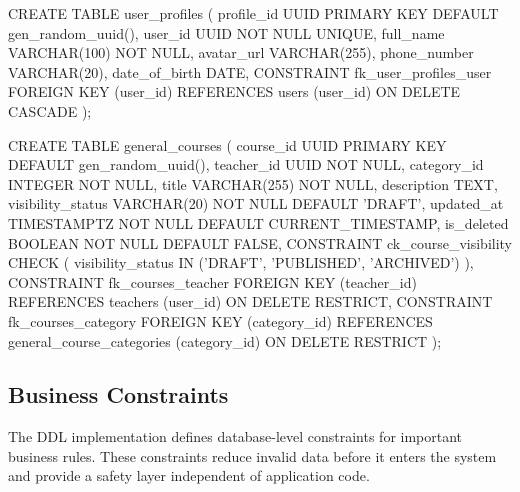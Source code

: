 \begin{sqlcode}[caption={Representative foreign key relationships},label={lst:ddl-foreign-key-examples}]
CREATE TABLE user_profiles (
    profile_id UUID PRIMARY KEY DEFAULT gen_random_uuid(),
    user_id UUID NOT NULL UNIQUE,
    full_name VARCHAR(100) NOT NULL,
    avatar_url VARCHAR(255),
    phone_number VARCHAR(20),
    date_of_birth DATE,
    CONSTRAINT fk_user_profiles_user
        FOREIGN KEY (user_id)
        REFERENCES users (user_id)
        ON DELETE CASCADE
);

CREATE TABLE general_courses (
    course_id UUID PRIMARY KEY DEFAULT gen_random_uuid(),
    teacher_id UUID NOT NULL,
    category_id INTEGER NOT NULL,
    title VARCHAR(255) NOT NULL,
    description TEXT,
    visibility_status VARCHAR(20) NOT NULL DEFAULT 'DRAFT',
    updated_at TIMESTAMPTZ NOT NULL DEFAULT CURRENT_TIMESTAMP,
    is_deleted BOOLEAN NOT NULL DEFAULT FALSE,
    CONSTRAINT ck_course_visibility CHECK (
        visibility_status IN ('DRAFT', 'PUBLISHED', 'ARCHIVED')
    ),
    CONSTRAINT fk_courses_teacher
        FOREIGN KEY (teacher_id)
        REFERENCES teachers (user_id)
        ON DELETE RESTRICT,
    CONSTRAINT fk_courses_category
        FOREIGN KEY (category_id)
        REFERENCES general_course_categories (category_id)
        ON DELETE RESTRICT
);
\end{sqlcode}

\subsection{Business Constraints}

The DDL implementation defines database-level constraints for important business rules. These constraints reduce invalid data before it enters the system and provide a safety layer independent of application code.

